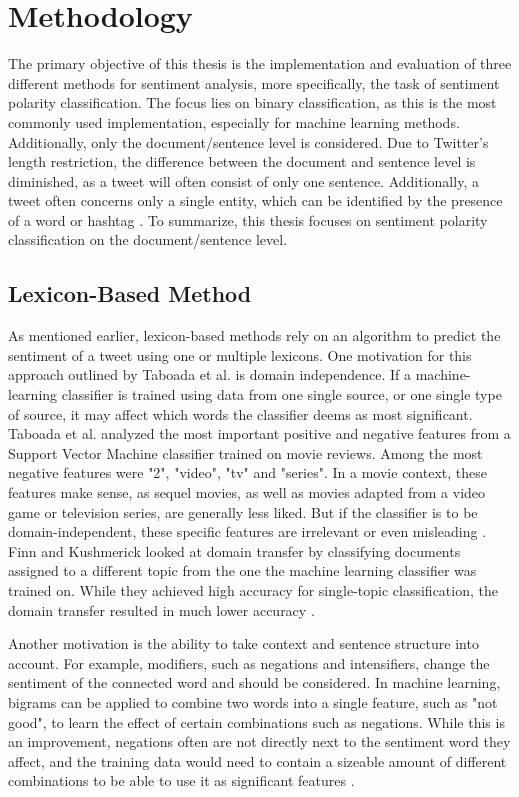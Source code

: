\chapter{Methodology}
\label{cha:Chapter4_Methodology}
The primary objective of this thesis is the implementation and evaluation of three different methods for sentiment analysis, more specifically, the task of sentiment polarity classification. The focus lies on binary classification, as this is the most commonly used implementation, especially for machine learning methods. Additionally, only the document/sentence level is considered. Due to Twitter's length restriction, the difference between the document and sentence level is diminished, as a tweet will often consist of only one sentence. Additionally, a tweet often concerns only a single entity, which can be identified by the presence of a word or hashtag \cite{DBLP:journals/csur/GiachanouC16}. To summarize, this thesis focuses on sentiment polarity classification on the document/sentence level.

\section{Lexicon-Based Method}
As mentioned earlier, lexicon-based methods rely on an algorithm to predict the sentiment of a tweet using one or multiple lexicons. One motivation for this approach outlined by Taboada et al. is domain independence. If a machine-learning classifier is trained using data from one single source, or one single type of source, it may affect which words the classifier deems as most significant. Taboada et al. analyzed the most important positive and negative features from a Support Vector Machine classifier trained on movie reviews. Among the most negative features were "2", "video", "tv" and "series". In a movie context, these features make sense, as sequel movies, as well as movies adapted from a video game or television series, are generally less liked. But if the classifier is to be domain-independent, these specific features are irrelevant or even misleading \cite{taboada}. Finn and Kushmerick looked at domain transfer by classifying documents assigned to a different topic from the one the machine learning classifier was trained on. While they achieved high accuracy for single-topic classification, the domain transfer resulted in much lower accuracy \cite{Finn03learningto}.

Another motivation is the ability to take context and sentence structure into account. For example, modifiers, such as negations and intensifiers, change the sentiment of the connected word and should be considered. In machine learning, bigrams can be applied to combine two words into a single feature, such as "not good", to learn the effect of certain combinations such as negations. While this is an improvement, negations often are not directly next to the sentiment word they affect, and the training data would need to contain a sizeable amount of different combinations to be able to use it as significant features \cite{taboada}.

